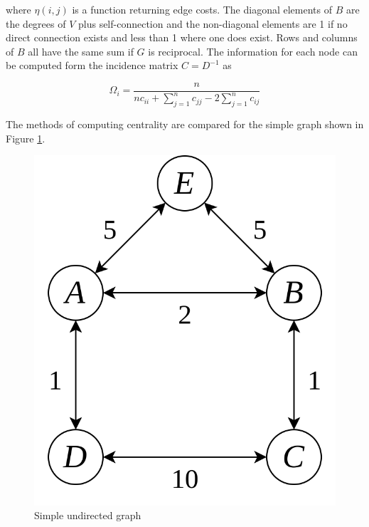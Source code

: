 \documentclass[12pt]{article}
\begin{document}
where $\eta(i, j)$ is a function returning edge costs. The diagonal elements of $B$ are the degrees of $V$ plus self-connection and the non-diagonal elements are 1 if no direct connection exists and less than 1 where one does exist. Rows and columns of $B$ all have the same sum if $G$ is reciprocal. The information for each node can be computed form the incidence matrix $C = D^{-1}$ as

\begin{equation}
	\Omega_i = \frac{n}{nc_{ii} + \sum_{j = 1}^{n} c_{jj} - 2 \sum_{j = 1}^{n}c_{ij}}
\end{equation}

The methods of computing centrality are compared for the simple graph shown in Figure \ref{fig:simple_graph}.

\begin{figure}
	\centering
	\includegraphics[width = \linewidth]{figs/simple_graph.png}
	\caption{Simple undirected graph}
	\label{fig:simple_graph}
\end{figure}

\bigskip

%
\end{document}
